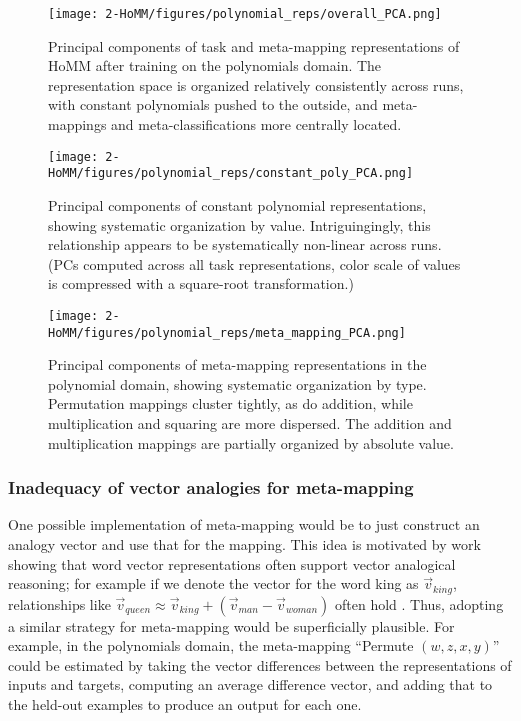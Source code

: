 \begin{figure}[ptbh]
\centering
\texttt{[image: 2-HoMM/figures/polynomial\_reps/overall\_PCA.png]}
\caption[Principal components of task and meta-mapping representations of HoMM after training on the polynomials domain.]{Principal components of task and meta-mapping representations of HoMM after training on the polynomials domain. The representation space is organized relatively consistently across runs, with constant polynomials pushed to the outside, and meta-mappings and meta-classifications more centrally located.} \label{fig:HoMM_polynomials:reps_overall_PCA}
\end{figure}

\begin{figure}[ptbh]
\centering
\texttt{[image: 2-HoMM/figures/polynomial\_reps/constant\_poly\_PCA.png]}
\caption[Principal components of constant polynomial representations, showing systematic organization by value.]{Principal components of constant polynomial representations, showing systematic organization by value. Intriguingingly, this relationship appears to be systematically non-linear across runs. (PCs computed across all task representations, color scale of values is compressed with a square-root transformation.)} \label{fig:HoMM_polynomials:reps_const_poly_PCA}
\end{figure}

\begin{figure}[ptbh]
\centering
\texttt{[image: 2-HoMM/figures/polynomial\_reps/meta\_mapping\_PCA.png]}
\caption[Principal components of meta-mapping representations in the polynomial domain, showing systematic organization by type.]{Principal components of meta-mapping representations in the polynomial domain, showing systematic organization by type. Permutation mappings cluster tightly, as do addition, while multiplication and squaring are more dispersed. The addition and multiplication mappings are partially organized by absolute value.} \label{fig:HoMM_polynomials:reps_meta_mapping_PCA}
\end{figure}

\subsubsection{Inadequacy of vector analogies for meta-mapping} \label{sec:HoMM:vector_analogies_inadequate}

One possible implementation of meta-mapping would be to just construct an analogy vector and use that for the mapping. This idea is motivated by work showing that word vector representations often support vector analogical reasoning; for example if we denote the vector for the word king as \(\vec{v}_{king}\), relationships like \(\vec{v}_{queen} \approx \vec{v}_{king} + \left(\vec{v}_{man} - \vec{v}_{woman} \right)\) often hold \citep{Mikolov2013}. Thus, adopting a similar strategy for meta-mapping would be superficially plausible. For example, in the polynomials domain, the meta-mapping ``Permute \((w, z, x, y)\)'' could be estimated by taking the vector differences between the representations of inputs and targets, computing an average difference vector, and adding that to the held-out examples to produce an output for each one.

